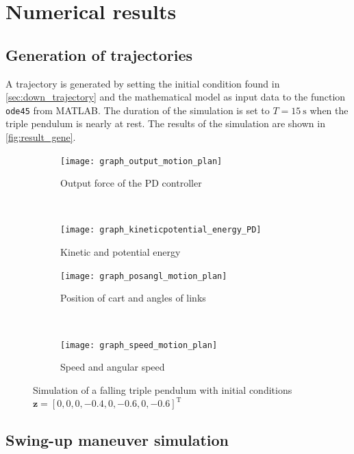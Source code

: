 \documentclass[a4paper,12pt]{article}
\begin{document}
\section{Numerical results}
\subsection{Generation of trajectories}
A trajectory is generated by setting the initial condition found in \autoref{sec:down_trajectory} and the mathematical model as input data to the function \texttt{ode45} from MATLAB. The duration of the simulation is set to $T=\SI{15}{\second}$ when the triple pendulum is nearly at rest. The results of the simulation are shown in \autoref{fig:result_gene}.

\begin{figure}[h]
    \centering
    \begin{subfigure}[t]{0.46\textwidth}
        \centering
        \texttt{[image: graph\_output\_motion\_plan]}
        \caption{Output force of the PD controller}
    \end{subfigure}%
    ~
    \begin{subfigure}[t]{0.46\textwidth}
        \centering
        \texttt{[image: graph\_kineticpotential\_energy\_PD]}
        \caption{Kinetic and potential energy}
    \end{subfigure}

    \begin{subfigure}[t]{0.46\textwidth}
        \centering
        \texttt{[image: graph\_posangl\_motion\_plan]}
        \caption{Position of cart and angles of links}
    \end{subfigure}%
    ~
    \begin{subfigure}[t]{0.46\textwidth}
        \centering
        \texttt{[image: graph\_speed\_motion\_plan]}
        \caption{Speed and angular speed}
    \end{subfigure}
    \caption{Simulation of a falling triple pendulum with initial conditions \\$\mathbf{z} = [0,0,0,\num{-0.4},0,\num{-0.6},0,\num{-0.6}]^\text{T}$}
     \label{fig:result_gene}
\end{figure}

\subsection{Swing-up maneuver simulation}
\end{document}
